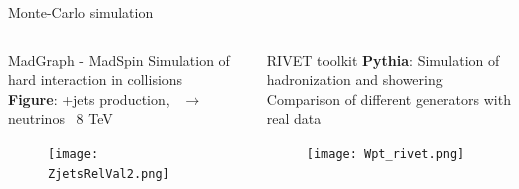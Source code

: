 \begin{frame}{Monte-Carlo simulation}
\vspace{-.4cm}
\begin{columns}
\begin{column}{.50\textwidth}
  \begin{block}{MadGraph - MadSpin}\tiny
    Simulation of hard interaction in collisions \\
    \textbf{Figure}: \Z+jets production, \Z~$\to$ neutrinos \MVAt~8 TeV
  \end{block}
\vspace{-.5cm}
\begin{figure}[!Hhtbp]
  \begin{center}
    \texttt{[image: ZjetsRelVal2.png]}
  \end{center}
\end{figure}
\end{column}

\begin{column}{.50\textwidth}
  \begin{block}{RIVET toolkit}\tiny
    \textbf{Pythia}: Simulation of hadronization and showering \\
    Comparison of different generators with real data %
  \end{block}
  \begin{figure}[!Hhtbp]
  \begin{center}
    \texttt{[image: Wpt\_rivet.png]}
  \end{center}
\end{figure}
\end{column}
\end{columns}

\end{frame}



